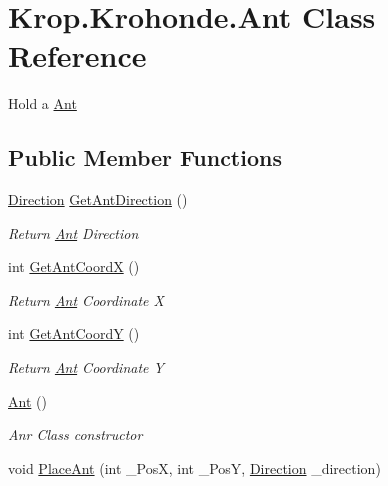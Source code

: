 \hypertarget{class_krop_1_1_krohonde_1_1_ant}{}\section{Krop.\+Krohonde.\+Ant Class Reference}
\label{class_krop_1_1_krohonde_1_1_ant}


Hold a \mbox{\hyperlink{class_krop_1_1_krohonde_1_1_ant}{Ant}}  


\subsection*{Public Member Functions}
\begin{DoxyCompactItemize}
\item 
\mbox{\hyperlink{namespace_krop_1_1_krohonde_a846d88876d5263c1530b67322bacd896}{Direction}} \mbox{\hyperlink{class_krop_1_1_krohonde_1_1_ant_a71d8ba38c51d6b9e415a61185295b3da}{Get\+Ant\+Direction}} ()
\begin{DoxyCompactList}\small\item\em Return \mbox{\hyperlink{class_krop_1_1_krohonde_1_1_ant}{Ant}} Direction \end{DoxyCompactList}\item 
int \mbox{\hyperlink{class_krop_1_1_krohonde_1_1_ant_ab34b58d7a999eedaee5c41aa73fcbae3}{Get\+Ant\+CoordX}} ()
\begin{DoxyCompactList}\small\item\em Return \mbox{\hyperlink{class_krop_1_1_krohonde_1_1_ant}{Ant}} Coordinate X \end{DoxyCompactList}\item 
int \mbox{\hyperlink{class_krop_1_1_krohonde_1_1_ant_a5b7e4c09838cd96cf1a37b804670e4c5}{Get\+Ant\+CoordY}} ()
\begin{DoxyCompactList}\small\item\em Return \mbox{\hyperlink{class_krop_1_1_krohonde_1_1_ant}{Ant}} Coordinate Y \end{DoxyCompactList}\item 
\mbox{\hyperlink{class_krop_1_1_krohonde_1_1_ant_a1b322ca07e3f5137795ec5fb79d50bb3}{Ant}} ()
\begin{DoxyCompactList}\small\item\em Anr Class constructor \end{DoxyCompactList}\item 
void \mbox{\hyperlink{class_krop_1_1_krohonde_1_1_ant_a9f03bb91be270eb5b336181a4fb35162}{Place\+Ant}} (int \+\_\+\+PosX, int \+\_\+\+PosY, \mbox{\hyperlink{namespace_krop_1_1_krohonde_a846d88876d5263c1530b67322bacd896}{Direction}} \+\_\+direction)

\end{DoxyCompactItemize}
